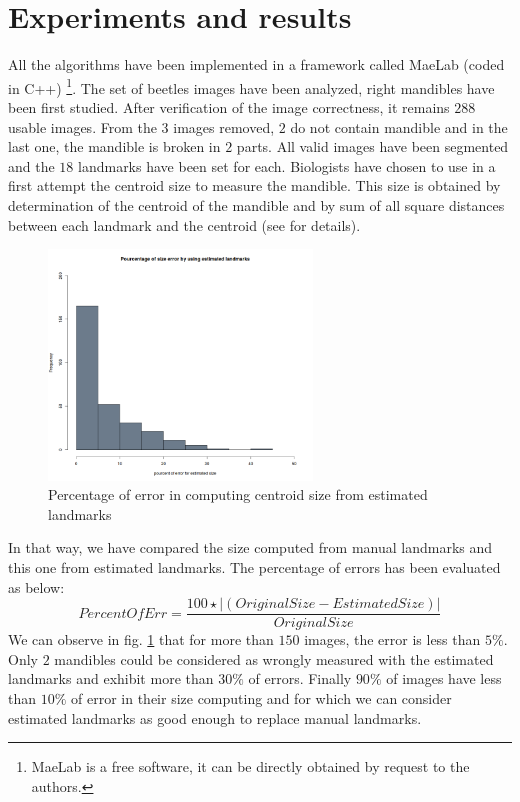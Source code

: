\documentclass[twoside,twocolumn,10pt]{article}
\begin{document}
\section{Experiments and results}
All the algorithms have been implemented in a framework called MaeLab (coded in C++)
\footnote{MaeLab is a free software, it can be directly obtained
 by request to the authors.}. The set of beetles images have
been analyzed, right mandibles have been first studied. After
verification of the image correctness, it remains $288$ usable 
images. From the $3$ images removed, $2$ do not contain mandible and
in the last one, the mandible is broken in $2$ parts. All valid 
images have been segmented and the $18$ landmarks have been set
for each. Biologists have chosen to use in a first attempt the centroid
size to measure the mandible. This size is obtained by determination of the
centroid of the mandible and by sum of all square distances 
between each landmark and the centroid (see \cite{web2010} for
details).
\begin{figure}[h!]
\centering
\includegraphics[width=7cm]{./images/frequency.png}
\caption{\small{Percentage of error in computing centroid size from estimated
landmarks}}
\label{percentage}
\end{figure}

In that way, we have compared the size computed from manual landmarks and this one from estimated
landmarks. The percentage of errors has been evaluated as below: 
{\small{
$$
PercentOfErr = \frac{100 \star |(Original Size - Estimated Size)|}{ Original Size}
$$
}}
We can observe in fig. \ref{percentage} that for more than $150$ images, the error
is less than $5\% $. Only $2$ mandibles could be considered as wrongly
measured with the estimated landmarks and exhibit more than  $30\% $
of errors. Finally $90\% $ of images have less than $10\% $ of error in
their size computing and for which we can consider estimated landmarks
as good enough to replace manual landmarks.
\end{document}
